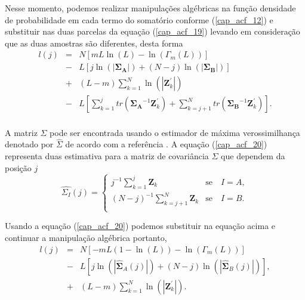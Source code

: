 \documentclass[conference]{IEEEtran}
\begin{document}
Nesse momento, podemos realizar  manipulações algébricas na função densidade de probabilidade em cada termo do somatório conforme (\ref{cap_acf_12}) e substituir nas duas parcelas da equação (\ref{cap_acf_19}) levando em consideração que as duas amostras são diferentes, desta forma
\begin{equation}
\begin{array}{lll}
	l(j)&=&N\left[mL\ln{\left(L\right)}-\ln{\left(\Gamma_m(L)\right)}\right]\\
	&-& L\left[j\ln{\left(|\mathbf{\Sigma_{A}}|\right)}+(N-j)\ln{\left(|\mathbf{\Sigma_{B}}|\right)}\right] \\
	&+&(L-m)\sum_{k=1}^{N}\ln{\left(|\mathbf{Z}_{k}^{'}|\right)}\\
	&-&L\left[\sum_{k=1}^{j}tr(\mathbf{\Sigma_{A}}^{-1}\mathbf{Z}_{k}^{'})+ \sum_{k=j+1}^{N}tr(\mathbf{\Sigma_{B}}^{-1}\mathbf{Z}_{k}^{'})\right]. \\
\end{array}
\end{equation}

A matriz $\Sigma$ pode ser encontrada usando o estimador de máxima verossimilhança denotado por $\widehat{\Sigma}$ de acordo com a referência \cite{good}. A equação (\ref{cap_acf_20}) representa duas estimativa para a matriz de covariância $\Sigma$ que dependem da posição $j$
\begin{equation}
\widehat{\Sigma_{I}}(j) = \left\{
\begin{array}{lc}
	j^{-1}\sum_{k=1}^{j}\mathbf{Z}_{k}  & \mbox{se}\quad I=A,  \\
        (N-j)^{-1}\sum_{k=j+1}^{N}\mathbf{Z}_{k} & \mbox{se}\quad I=B. \\
\end{array}
\right.
\end{equation}

Usando a equação (\ref{cap_acf_20}) podemos substituir na equação acima e continuar a manipulação algébrica
portanto, 
\begin{equation}
\begin{array}{rcl}
	l(j)&=&N\left[-mL(1-\ln{\left(L\right)})-\ln{\left(\Gamma_m(L)\right)}\right]\\
	&-&L\left[j\ln{\left(|\mathbf{\widehat{\Sigma}}_{A}(j)|\right)} +(N-j)\ln{\left(|\mathbf{\widehat{\Sigma}}_{B}(j)|\right)}\right], \\
	&+&(L-m)\sum_{k=1}^{N}\ln{\left(|\mathbf{Z}_{k}^{'}|\right)}. \\
\end{array}
\end{equation}
\end{document}
